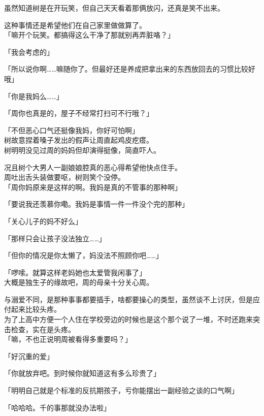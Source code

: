 虽然知道树是在开玩笑，但自己天天看着那俩放闪，还真是笑不出来。

这种事情还是希望他们在自己家里做做算了。\\

「嘛开个玩笑。都搞得这么干净了那就别再弄脏咯？」

「我会考虑的」

「所以说你啊……嘛随你了。但最好还是养成把拿出来的东西放回去的习惯比较好哦」

「你是我妈么……」

「周你也真是的，屋子不经常打扫可不行哦？」

「不但恶心口气还挺像我妈，你好可怕啊」\\

树故意捏着嗓子发出的假声让周直起鸡皮疙瘩。\\

树明明没见过周的妈妈但却演得挺像，简直吓人。

况且树个大男人一副娘娘腔真的恶心得希望他快点住手。\\

周吐出舌头装做要呕，树则笑个没停。\\

「周你妈原来是这样的啊。我妈是真的不管事的那种啊」

「要说我还羡慕你嘞。我妈是事情一件一件没个完的那种」

「关心儿子的妈不好么」

「那样只会让孩子没法独立……」

「但你的情况是你太懒了，妈没法不照顾你吧……」

「啰嗦。就算这样老妈她也太爱管我闲事了」\\

大概是独生子的缘故吧，周的母亲十分关心周。

与溺爱不同，是那种事事都要插手，啥都要操心的类型，虽然谈不上讨厌，但是应付起来比较头疼。\\

为了上高中方便一个人住在学校旁边的时候也是这个那个说了一堆，不时还跑来突击检查，实在是头疼。\\

「嘛，不也正说明周被看得多重要吗？」

「好沉重的爱」

「你就放弃吧。到时候你就知道这有多么珍贵了」

「明明自己就是个标准的反抗期孩子，亏你能摆出一副经验之谈的口气啊」

「哈哈哈。千的事那就没办法啦」\\

